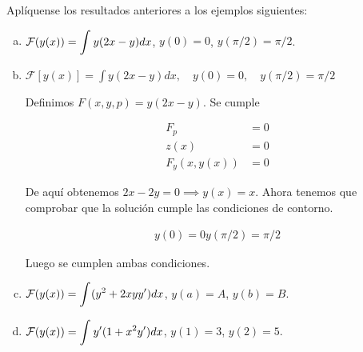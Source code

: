 \begin{ejercicio}
Aplíquense los resultados anteriores a los ejemplos siguientes:
\begin{enumerate}[a)]
\item $\mathcal{F}(y(x))=\displaystyle\int_{  }^{  } y(2x-y)dx$, $y(0)=0$, $y(\pi/2)=\pi/2$.
\item $\mathcal{F}[y(x)] = \int{y(2x-y)dx}, \quad y(0) = 0, \quad y(\pi/2) = \pi/2$

    Definimos $F(x,y,p) = y(2x-y)$. Se cumple

    \begin{align*}
      F_p &= 0\\
      z(x) &= 0\\
      F_y(x,y(x)) &= 0
    \end{align*}

    De aquí obtenemos $2x-2y = 0 \implies y(x) = x$. Ahora tenemos que
    comprobar que la solución cumple las condiciones de contorno.

    \begin{align*}
      y(0) = 0
      y(\pi/2) = \pi/2
    \end{align*}

    Luego se cumplen ambas condiciones.
\item $\mathcal{F}(y(x))=\displaystyle\int_{  }^{  } (y^2+2xyy')dx$, $y(a)=A$, $y(b)=B$.
\item $\mathcal{F}(y(x))=\displaystyle\int_{  }^{  } y'(1+x^2y')dx$, $y(1)=3$, $y(2)=5$.
\end{enumerate}
\end{ejercicio}

